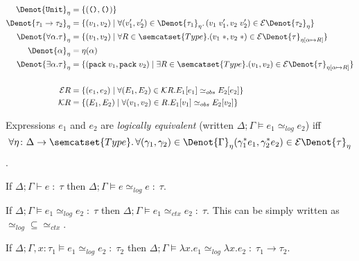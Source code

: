 \begin{alignat*}{2}
  \Denot{\texttt{Unit}}_{\eta} & = \{ (\texttt{()}, \texttt{()}) \} \\
  \Denot{\tau_1 \to \tau_2}_{\eta} & = \{ (v_1, v_2) \mid
    \forall (v_1', v_2') \in \Denot{\tau_1}_{\eta}\ldotp
    (v_1\;v_1', v_2\;v_2' ) \in \mathcal{E}\Denot{\tau_2}_{\eta} \} \\
  \Denot{\forall\alpha.\tau}_{\eta} & = \{ (v_1, v_2) \mid \forall R \in \semcatset{Type}.
    (v_1\;*, v_2\;*) \in \mathcal{E}\Denot{\tau}_{\eta[\alpha \mapsto R]} \} \\
  \Denot{\alpha}_{\eta} & = \eta(\alpha) \\
  \Denot{\exists\alpha.\tau}_{\eta} & =
    \{ (\texttt{pack}\;v_1,\texttt{pack}\;v_2) \mid \exists R \in \semcatset{Type}.
    (v_1, v_2) \in \mathcal{E}\Denot{\tau}_{\eta[\alpha \mapsto R]} \} \\\\
  \mathcal{E}R & = \{ (e_1, e_2) \mid \forall (E_1, E_2) \in \mathcal{K} R. E_1[e_1] \simeq_{obs}  E_2[e_2]\}\\
  \mathcal{K}R & = \{ (E_1, E_2) \mid \forall (v_1, v_2) \in R. E_1[v_1] \simeq_{obs}  E_2[v_2]\}\\
\end{alignat*}


\begin{defin}
  Expressions $e_1$ and $e_2$ are \emph{logically equivalent}
  (written $\Delta; \Gamma \models e_1 \simeq_{log} e_2$)
  iff
  \[
    \forall \eta \colon \Delta \to \semcatset{Type}\ldotp
    \forall (\gamma_1, \gamma_2) \in \Denot{\Gamma}_{\eta} \\
    (\gamma_1^*e_1, \gamma_2^*e_2) \in \mathcal{E}\Denot{\tau}_{\eta}
  \].
\end{defin}

\begin{theorem}
  If $\Delta; \Gamma \vdash e \;:\; \tau$ then $\Delta; \Gamma \models e \simeq_{log} e \;:\; \tau$.
\end{theorem}

\begin{theorem}[Soundness]\label{thm:soundness-bin-log-rel}
  If $\Delta; \Gamma \models e_1 \simeq_{log} e_2 \;:\; \tau$
  then $\Delta; \Gamma \models e_1 \simeq_{ctx} e_2 \;:\; \tau$.
  This can be simply written as $\simeq_{log} \subseteq \simeq_{ctx}$.
\end{theorem}

\begin{lemma}
  If $\Delta; \Gamma, x : \tau_1 \models e_1 \simeq_{log} e_2 \;:\; \tau_2$ then
  $\Delta; \Gamma \models \lambda x.e_1 \simeq_{log} \lambda x.e_2 \;:\; \tau_1 \to \tau_2$.
\end{lemma}


